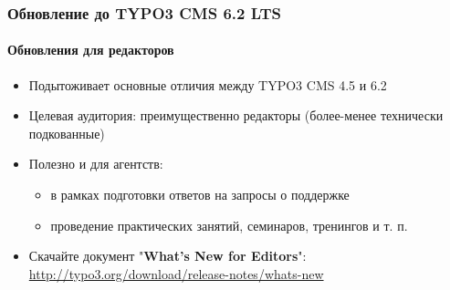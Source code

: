 \begin{frame}[fragile]
	\frametitle{Обновление до TYPO3 CMS 6.2 LTS}
	\framesubtitle{Обновления для редакторов}

	\begin{itemize}
		\item Подытоживает основные отличия между TYPO3 CMS 4.5 и 6.2
		\item Целевая аудитория: преимущественно редакторы (более-менее технически подкованные)
		\item Полезно и для агентств:

			\begin{itemize}
				\item в рамках подготовки ответов на запросы о поддержке
				\item проведение практических занятий, семинаров, тренингов и т. п.
			\end{itemize}

		\item Скачайте документ "\textbf{What's New for Editors}":\newline
			\smaller\url{http://typo3.org/download/release-notes/whats-new}\normalsize

	\end{itemize}

\end{frame}


